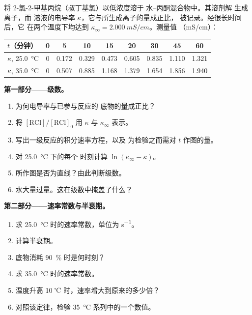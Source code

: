 \begin{problem}
\label{pb:b1:nucleophilic-substitution:1}
将 2-氯-2-甲基丙烷（叔丁基氯）以低浓度溶于
水–丙酮混合物中。其溶剂解
 生成离子，而
溶液的电导率 $\kappa$，它与所生成离子的量成正比，
被记录。经很长时间后，它
在两个温度下均达到 $\kappa_\infty = \qty{2.000}{mS/cm}$。测量值
（\unit{mS/cm}）：

\begin{center}
\begin{tabular}{lcccccccc}
\hline
$t$（分钟） & 0 & 5 & 10 & 15 & 20 & 30 & 45 & 60 \\
\hline
$\kappa$, \qty{25.0}{\celsius} & 0 & 0.172 & 0.329 & 0.473 & 0.605 & 0.835 & 1.110 & 1.321 \\
$\kappa$, \qty{35.0}{\celsius} & 0 & 0.507 & 0.885 & 1.168 & 1.379 & 1.654 & 1.856 & 1.940 \\
\hline
\end{tabular}
\end{center}

\medskip
\noindent\textbf{第一部分——级数。}
\begin{enumerate}
  \item 为何电导率与已参与反应的
        底物的量成正比？
  \item 将 $[\mathrm{RCl}]/[\mathrm{RCl}]_0$ 用
        $\kappa$ 与 $\kappa_\infty$ 表示。
  \item 写出一级反应的积分速率方程，以及
        为检验之而需对 $t$ 作图的量。
  \item 对 \qty{25.0}{\celsius} 下的每个
        时刻计算 $\ln(\kappa_\infty - \kappa)$。
  \item 所作图是否为直线？由此判断级数。
  \item 水大量过量。这在级数中掩盖了什么？
\end{enumerate}

\medskip
\noindent\textbf{第二部分——速率常数与半衰期。}
\begin{enumerate}[resume]
  \item 求 \qty{25.0}{\celsius} 时的速率常数，单位为 \unit{s^{-1}}。
  \item 计算半衰期。
  \item 底物消耗 \qty{90}{\percent} 时是何时刻？
  \item 求 \qty{35.0}{\celsius} 时的速率常数。
  \item 温度升高 10 ℃ 时，速率增大到原来的多少倍？
  \item 对照该定律，检验 \qty{35}{\celsius} 系列中的一个数值。
\end{enumerate}


\end{problem}
